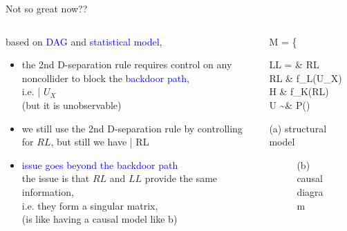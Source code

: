 \begin{frame}
	{Not so great now??}
	\begin{columns}
		\begin{column}{0.5\textwidth}
			based on \textcolor{blue}{DAG} and \textcolor{blue}{statistical model},
			\begin{itemize}
				\item the 2nd D-separation rule requires control on any noncollider to block the \textcolor{blue}{backdoor path}, \\
				i.e.  \; | $U_{X}$ \\
				{\small (but it is unobservable)}
				\item we still use the 2nd D-separation rule by controlling for $RL$, but still we have  \; | RL \\
				\item \textcolor{blue}{issue goes beyond the backdoor path} \\
				the issue is that $RL$ and $LL$ provide the same information, \\
				i.e. they form a singular matrix, \\
				{\small (is like having a causal model like b) }
			\end{itemize}
		\end{column}
		\begin{column}{0.5\textwidth}  
			\begin{equ}
				M = \left\{ \begin{aligned} 
					LL = & \; RL \\
					RL \leftarrow & \; f_{L}(U_{X}) \\
					H \leftarrow & \; f_{K}(RL) \\
					U \sim & \; P()
				\end{aligned} \right
				\caption*{(a) structural model}
			\end{equ}
			\begin{figure}
				\caption*{(b) causal diagram}
			\end{figure}
		\end{column}
	\end{columns}
\end{frame}
